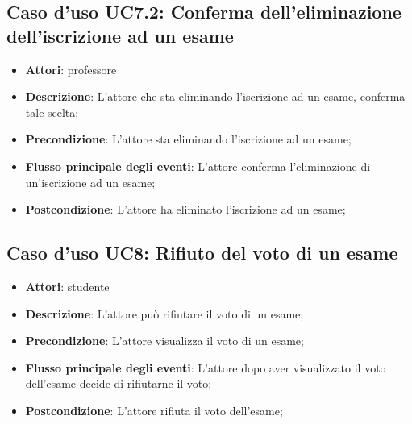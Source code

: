 \subsection{Caso d'uso \texorpdfstring{UC7.2}{UC7.2}: Conferma dell'eliminazione dell'iscrizione ad un esame}
\begin{itemize}
\item \textbf{Attori}: professore
\item \textbf{Descrizione}: L'attore che sta eliminando l'iscrizione ad un esame, conferma tale scelta;
\item \textbf{Precondizione}: L'attore sta eliminando l'iscrizione ad un esame;
\item \textbf{Flusso principale degli eventi}: L'attore conferma l'eliminazione di un'iscrizione ad un esame;
\item \textbf{Postcondizione}: L'attore ha eliminato l'iscrizione ad un esame;
\end{itemize}
\subsection{Caso d'uso \texorpdfstring{UC8}{UC8}: Rifiuto del voto di un esame}
\begin{itemize}
\item \textbf{Attori}: studente
\item \textbf{Descrizione}: L'attore può rifiutare il voto di un esame;
\item \textbf{Precondizione}: L'attore visualizza il voto di un esame;
\item \textbf{Flusso principale degli eventi}: L'attore dopo aver visualizzato il voto dell'esame decide di rifiutarne il voto;
\item \textbf{Postcondizione}: L'attore rifiuta il voto dell'esame;
\end{itemize}
